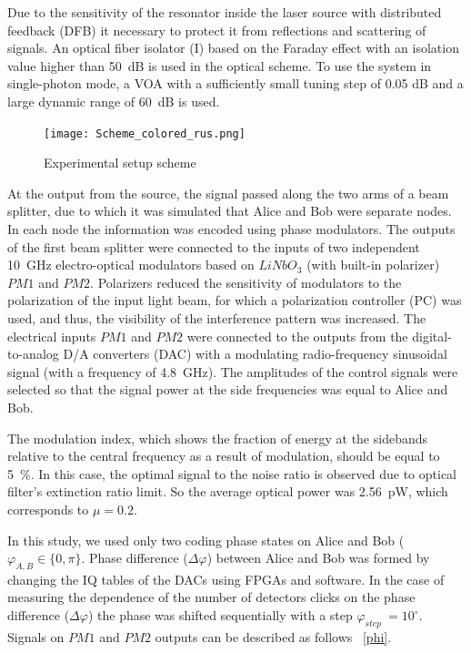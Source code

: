 Due to the sensitivity of the resonator inside the laser source with distributed feedback (DFB) it necessary to protect it from reflections and scattering of signals. An optical fiber isolator (I) based on the Faraday effect with an isolation value higher than 50~dB is used in the optical scheme. To use the system in single-photon mode, a VOA with a sufficiently small tuning step of 0.05 dB and a large dynamic range of 60~dB is used.

  

  \begin{figure}[ht]
  \centering
  \texttt{[image: Scheme\_colored\_rus.png]}
  \caption{Experimental setup scheme}
  \label{fig:RF_sin}
\end{figure}

  
 
  
At the output from the source, the signal passed along the two arms of  a beam splitter, due to which it was simulated that Alice and Bob were separate nodes. In each node the information was encoded using phase modulators. The outputs of the first beam splitter were connected to the inputs of two independent 10~GHz electro-optical modulators based on $LiNbO_3$ (with built-in polarizer) $PM1$ and $PM2$. Polarizers reduced the sensitivity of modulators to the polarization of the input light beam, for which a polarization controller (PC) was used, and thus, the visibility of the interference pattern was increased. The electrical inputs $PM1$ and $PM2$ were connected to the outputs from the digital-to-analog D/A converters (DAC) with a modulating radio-frequency sinusoidal signal (with a frequency of 4.8~GHz). The amplitudes of the control signals were selected so that the signal power at the side frequencies was equal to Alice and Bob.

The modulation index, which shows the fraction of energy at the sidebands relative to the central frequency as a result of modulation, should be equal to 5~\%. In this case, the optimal signal to the noise ratio is observed due to optical filter's extinction ratio limit. So the average optical power was 2.56~pW, which corresponds to $\mu=0.2$.  


In this study, we used only two coding phase states on Alice and Bob ($\varphi_{A,B}\in\{0,\pi\}$. Phase difference ($\Delta\varphi$) between Alice and Bob was formed by changing the IQ tables of the DACs using FPGAs and software. In the case of measuring the dependence of the number of detectors clicks on the phase difference ($\Delta\varphi$) the phase was shifted sequentially with a step $\varphi_{step}\ = 10^{\circ}$. Signals on $PM1$ and $PM2$ outputs can be described as follows ~\ref{phi}.

